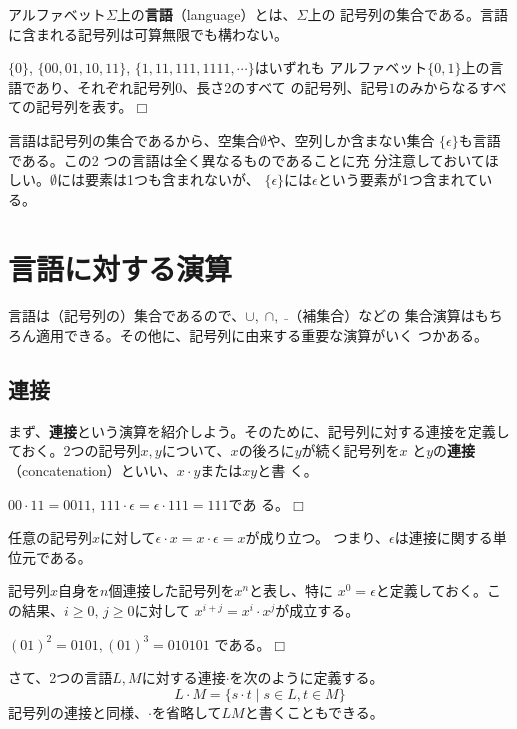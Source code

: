 アルファベット$\Sigma$上の{\bf 言語}（language）とは、$\Sigma$上の
記号列の集合である。言語に含まれる記号列は可算無限でも構わない。

\begin{example}
 $\{0\}$, $\{00, 01, 10, 11\}$, $\{1, 11, 111, 1111, \cdots\}$はいずれも
 アルファベット$\{0, 1\}$上の言語であり、それぞれ記号列$0$、長さ2のすべて
 の記号列、記号$1$のみからなるすべての記号列を表す。$\Box$
\end{example}

言語は記号列の集合であるから、空集合$\emptyset$や、空列しか含まない集合
$\{\epsilon\}$も言語である。この2 つの言語は全く異なるものであることに充
分注意しておいてほしい。$\emptyset$には要素は1つも含まれないが、
$\{\epsilon\}$には$\epsilon$という要素が1つ含まれている。

\section{言語に対する演算}

言語は（記号列の）集合であるので、$\cup,\; \cap,\; \bar{\;}$（補集合）などの
集合演算はもちろん適用できる。その他に、記号列に由来する重要な演算がいく
つかある。

\subsection{連接}

まず、{\bf 連接}という演算を紹介しよう。そのために、記号列に対する連接を定義し
ておく。2つの記号列$x, y$について、$x$の後ろに$y$が続く記号列を$x$
と$y$の{\bf 連接}（concatenation）といい、$x\cdot y$または$xy$と書
く。
\begin{example}
 $00\cdot 11 = 0011$, $111\cdot \epsilon = \epsilon\cdot 111 = 111$であ
 る。$\Box$
\end{example}

任意の記号列$x$に対して$\epsilon\cdot x = x\cdot\epsilon = x$が成り立つ。
つまり、$\epsilon$は連接に関する単位元である。

記号列$x$自身を$n$個連接した記号列を$x^n$と表し、特に
$x^0=\epsilon$と定義しておく。この結果、$i\geq 0,\, j\geq 0$に対して
$x^{i+j} = x^i\cdot x^j$が成立する。

\begin{example}
 $(01)^2 = 0101, (01)^3 = 010101$ である。$\Box$
\end{example}

さて、2つの言語$L, M$に対する連接$\cdot$を次のように定義する。
\begin{equation*}
  L\cdot M = \{s\cdot t \mid s \in L, t \in M\}
\end{equation*}
記号列の連接と同様、$\cdot$を省略して$LM$と書くこともできる。

